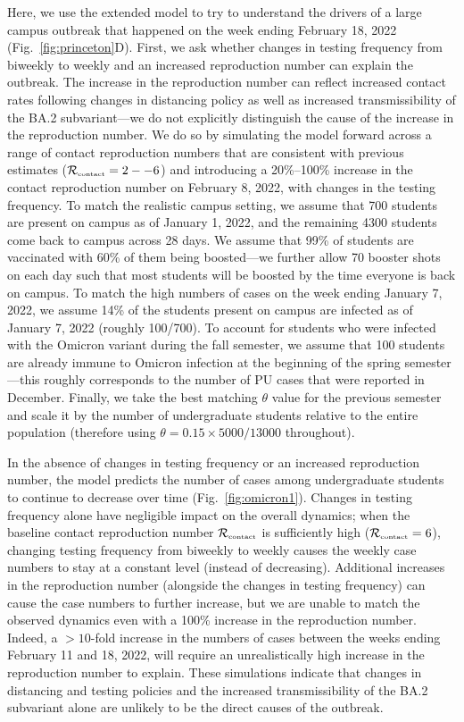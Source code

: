 \documentclass[12pt]{article}
\newcommand{\fref}[1]{Fig.~\ref{fig:#1}}
\newcommand{\Rx}[1]{\ensuremath{{\mathcal R}_{#1}}}
\newcommand{\Rc}{\Rx{\textrm{\tiny{contact}}}}
\begin{document}
Here, we use the extended model to try to understand the drivers of a large campus outbreak that happened on the week ending February 18, 2022 (\fref{princeton}D).
First, we ask whether changes in testing frequency from biweekly to weekly and an increased reproduction number can explain the outbreak. 
The increase in the reproduction number can reflect increased contact rates following changes in distancing policy as well as increased transmissibility of the BA.2 subvariant---we do not explicitly distinguish the cause of the increase in the reproduction number. 
We do so by simulating the model forward across a range of contact reproduction numbers that are consistent with previous estimates ($\Rc=2--6$) and introducing a 20\%--100\% increase in the contact reproduction number on February 8, 2022, with changes in the testing frequency.
To match the realistic campus setting, we assume that 700 students are present on campus as of January 1, 2022, and the remaining 4300 students come back to campus across 28 days.
We assume that 99\% of students are vaccinated with 60\% of them being boosted---we further allow 70 booster shots on each day such that most students will be boosted by the time everyone is back on campus.
To match the high numbers of cases on the week ending January 7, 2022, we assume 14\% of the students present on campus are infected as of January 7, 2022 (roughly 100/700).
To account for students who were infected with the Omicron variant during the fall semester, we assume that 100 students are already immune to Omicron infection at the beginning of the spring semester---this roughly corresponds to the number of PU cases that were reported in December.
Finally, we take the best matching $\theta$ value for the previous semester and scale it by the number of undergraduate students relative to the entire population (therefore using $\theta = 0.15 \times 5000/13000$ throughout).

In the absence of changes in testing frequency or an increased reproduction number, the model predicts the number of cases among undergraduate students to continue to decrease over time (\fref{omicron1}).
Changes in testing frequency alone have negligible impact on the overall dynamics; when the baseline contact reproduction number $\Rc$ is sufficiently high ($\Rc = 6$), changing testing frequency from biweekly to weekly causes the weekly case numbers to stay at a constant level (instead of decreasing).
Additional increases in the reproduction number (alongside the changes in testing frequency) can cause the case numbers to further increase, but we are unable to match the observed dynamics even with a 100\% increase in the reproduction number.
Indeed, a $>10$-fold increase in the numbers of cases between the weeks ending February 11 and 18, 2022, will require an unrealistically high increase in the reproduction number to explain.
These simulations indicate that changes in distancing and testing policies and the increased transmissibility of the BA.2 subvariant alone are unlikely to be the direct causes of the outbreak.
\end{document}
